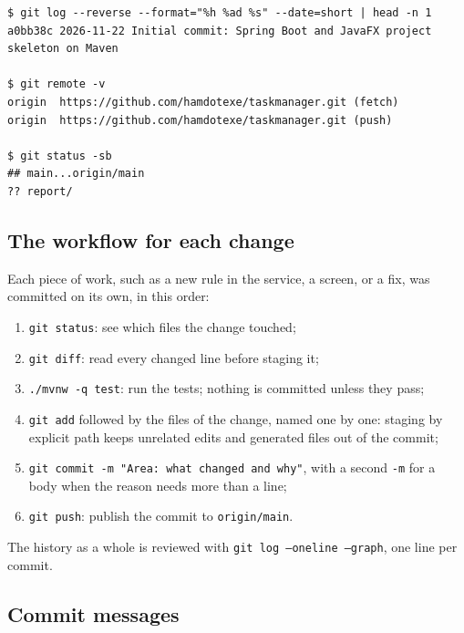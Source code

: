 \begin{lstlisting}[style=terminal, caption={The initial commit, the remote and the tracking branch, in the live
repository}, label={lst:remote}]
$ git log --reverse --format="%h %ad %s" --date=short | head -n 1
a0bb38c 2026-11-22 Initial commit: Spring Boot and JavaFX project skeleton on Maven

$ git remote -v
origin	https://github.com/hamdotexe/taskmanager.git (fetch)
origin	https://github.com/hamdotexe/taskmanager.git (push)

$ git status -sb
## main...origin/main
?? report/
\end{lstlisting}

\subsection{The workflow for each change}

Each piece of work, such as a new rule in the service, a screen, or a fix, was committed on its own, in this order:
\begin{enumerate}
  \item \texttt{git status}: see which files the change touched;
  \item \texttt{git diff}: read every changed line before staging it;
  \item \texttt{./mvnw -q test}: run the tests; nothing is committed unless they pass;
  \item \texttt{git add} followed by the files of the change, named one by one: staging by explicit path keeps
        unrelated edits and generated files out of the commit;
  \item \texttt{git commit -m "Area: what changed and why"}, with a second \texttt{-m} for a body when the reason
        needs more than a line;
  \item \texttt{git push}: publish the commit to \texttt{origin/main}.
\end{enumerate}
The history as a whole is reviewed with \texttt{git log --oneline --graph}, one line per commit.

\subsection{Commit messages}

